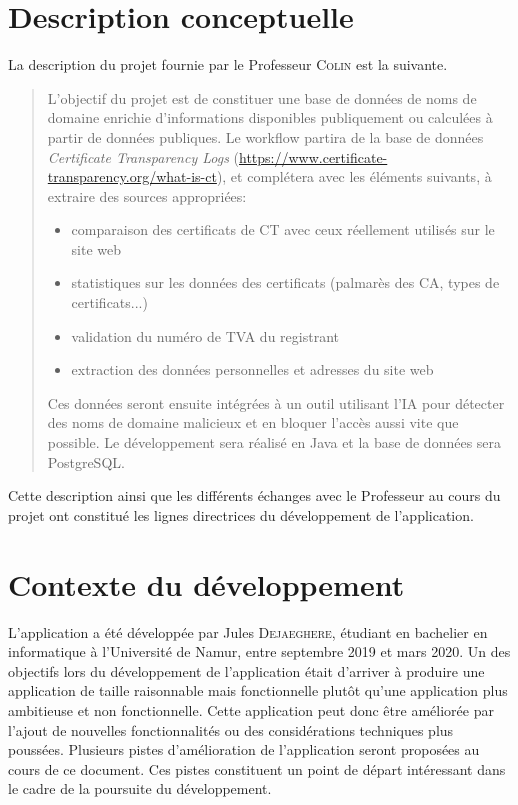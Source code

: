 \documentclass{article}
\begin{document}
\section{Description conceptuelle}

La description du projet fournie par le Professeur \textsc{Colin} est la suivante.

\begin{quotation}
L'objectif du projet est de constituer une base de données de noms de domaine enrichie d'informations disponibles publiquement ou calculées à partir de données publiques. Le workflow partira de la base de données \emph{Certificate Transparency Logs} (\url{https://www.certificate-transparency.org/what-is-ct}), et complétera avec les éléments suivants, à extraire des sources appropriées:
\begin{itemize}
    \item comparaison des certificats de CT avec ceux réellement utilisés sur le site web
    \item statistiques sur les données des certificats (palmarès des CA, types de certificats...)
    \item validation du numéro de TVA du registrant
    \item extraction des données personnelles et adresses du site web 
\end{itemize}
Ces données seront ensuite intégrées à un outil utilisant l'IA pour détecter des noms de domaine malicieux et en bloquer l'accès aussi vite que possible. Le développement sera réalisé en Java et la base de données sera PostgreSQL.
\end{quotation}

Cette description ainsi que les différents échanges avec le Professeur au cours du projet ont constitué les lignes directrices du développement de l'application.  


\section{Contexte du développement}

L'application a été développée par Jules \textsc{Dejaeghere}, étudiant en bachelier en informatique à l'Université de Namur, entre septembre 2019 et mars 2020.  Un des objectifs lors du développement de l'application était d'arriver à produire une application de taille raisonnable mais fonctionnelle plutôt qu'une application plus ambitieuse et non fonctionnelle.  Cette application peut donc être améliorée par l'ajout de nouvelles fonctionnalités ou des considérations techniques plus poussées.  Plusieurs pistes d'amélioration de l'application seront proposées au cours de ce document.  Ces pistes constituent un point de départ intéressant dans le cadre de la poursuite du développement.
\end{document}
